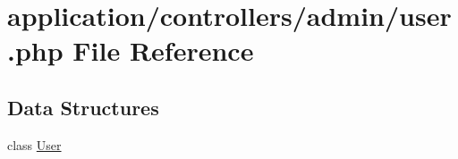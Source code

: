 \hypertarget{user_8php}{\section{application/controllers/admin/user.php File Reference}
\label{user_8php}
}
\subsection*{Data Structures}
\begin{DoxyCompactItemize}
\item 
class \hyperlink{class_user}{User}
\end{DoxyCompactItemize}

